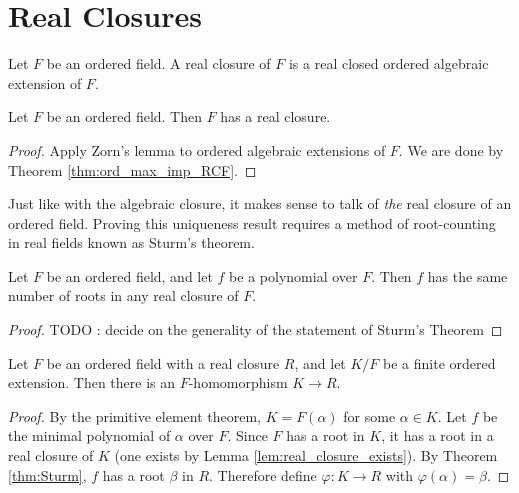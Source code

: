 \section{Real Closures}

\begin{definition}
  \label{def:real_closure}
  \leanok
  Let $F$ be an ordered field. A real closure of $F$ is a real closed ordered algebraic extension of $F$.
\end{definition}

\begin{lemma}
  \label{lem:real_closure_exists}
  Let $F$ be an ordered field. Then $F$ has a real closure.
\end{lemma}
\begin{proof}
  Apply Zorn's lemma to ordered algebraic extensions of $F$. We are done by Theorem \ref{thm:ord_max_imp_RCF}.
\end{proof}

Just like with the algebraic closure, it makes sense to talk of \textit{the} real closure of an ordered field. Proving this uniqueness result requires a method of root-counting in real fields known as Sturm's theorem.

\begin{theorem}
  \label{thm:Sturm}
  Let $F$ be an ordered field, and let $f$ be a polynomial over $F$. Then $f$ has the same number of roots in any real closure of $F$.
\end{theorem}
\begin{proof}
  TODO : decide on the generality of the statement of Sturm's Theorem
\end{proof}


\begin{lemma}
  \label{lem:closure_emb_ext_unordered}
  Let $F$ be an ordered field with a real closure $R$, and let $K/F$ be a finite ordered extension. Then there is an $F$-homomorphism $K\to R$.
\end{lemma}
\begin{proof}
  By the primitive element theorem, $K=F(\alpha)$ for some $\alpha\in K$. Let $f$ be the minimal polynomial of $\alpha$ over $F$. Since $F$ has a root in $K$, it has a root in a real closure of $K$ (one exists by Lemma \ref{lem:real_closure_exists}). By Theorem \ref{thm:Sturm}, $f$ has a root $\beta$ in $R$. Therefore define $\varphi:K\to R$ with $\varphi(\alpha)=\beta$.
\end{proof}

